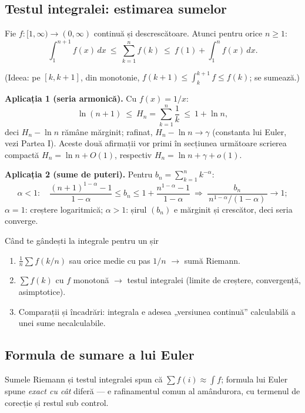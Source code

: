 \subsection{Testul integralei: estimarea sumelor}

\begin{teorema}
Fie $f:[1,\infty)\to(0,\infty)$ continuă și descrescătoare. Atunci pentru orice $n\ge 1$:
\[
\int_1^{n+1}f(x)\,dx\ \le\ \sum_{k=1}^{n}f(k)\ \le\ f(1)+\int_1^{n}f(x)\,dx.
\]
\end{teorema}

(Ideea: pe $[k,k+1]$, din monotonie, $f(k+1)\le\int_k^{k+1}f\le f(k)$; se sumează.)

\textbf{Aplicația 1 (seria armonică).} Cu $f(x)=1/x$:
\[
\ln(n+1)\ \le\ H_n=\sum_{k=1}^n\frac1k\ \le\ 1+\ln n,
\]
deci $H_n-\ln n$ rămâne mărginit; rafinat, $H_n-\ln n\to\gamma$ (constanta lui Euler, vezi Partea I). Aceste două afirmații vor primi în secțiunea următoare scrierea compactă $H_n=\ln n+O(1)$, respectiv $H_n=\ln n+\gamma+o(1)$.

\textbf{Aplicația 2 (sume de puteri).} Pentru $b_n=\sum_{k=1}^n k^{-\alpha}$:
\[
\alpha<1:\quad \frac{(n+1)^{1-\alpha}-1}{1-\alpha}\le b_n\le 1+\frac{n^{1-\alpha}-1}{1-\alpha}
\ \Rightarrow\ \frac{b_n}{\,n^{1-\alpha}/(1-\alpha)\,}\to1;
\]
$\alpha=1$: creștere logaritmică; $\alpha>1$: șirul $(b_n)$ e mărginit și crescător, deci seria converge.

\begin{tehbox}{Când te gândești la integrale pentru un șir}
\begin{enumerate}[leftmargin=*, itemsep=1pt]
\item $\frac1n\sum f(k/n)$ sau orice medie cu pas $1/n$ $\to$ sumă Riemann.
\item $\sum f(k)$ cu $f$ monotonă $\to$ testul integralei (limite de creștere, convergență, asimptotice).
\item Comparații și încadrări: integrala e adesea „versiunea continuă'' calculabilă a unei sume necalculabile.
\end{enumerate}
\end{tehbox}

\subsection{Formula de sumare a lui Euler}

Sumele Riemann și testul integralei spun că $\sum f(i)\approx\int f$; formula lui Euler spune \emph{exact cu cât} diferă --- e rafinamentul comun al amândurora, cu termenul de corecție și restul sub control.

